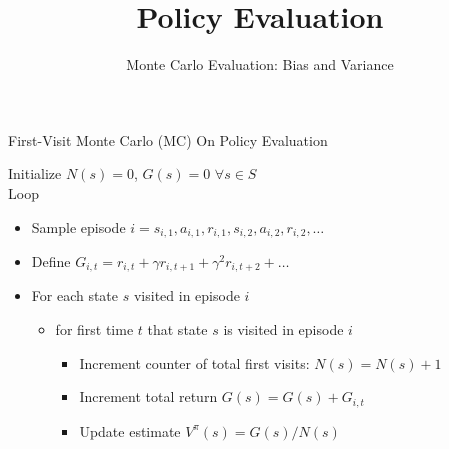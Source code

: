 


\title[Reinforcement Learning: Policy Evaluation]{Policy Evaluation}
\subtitle{Monte Carlo Evaluation: Bias and Variance}




	
	\maketitle

\begin{frame}[c]{First-Visit Monte Carlo (MC) On Policy Evaluation}

Initialize $N(s) = 0$, $G(s) = 0$ $\forall s \in S$\\
Loop 
\begin{itemize}
	\item Sample episode $i = s_{i,1}, a_{i,1}, r_{i,1}, s_{i,2}, a_{i,2}, r_{i,2}, \ldots$
	\item Define $G_{i,t} = r_{i,t} + \gamma r_{i,t+1} + \gamma^2 r_{i,t+2} + \ldots$
	\item For each state $s$ visited in episode $i$
	\begin{itemize}
		\item for first time $t$ that state $s$ is visited in episode $i$
		\begin{itemize}
			\item Increment counter of total first visits: $N(s) = N(s) + 1$
			\item Increment total return $G(s) = G(s) + G_{i,t}$
			\item Update estimate $V^\pi (s) = G(s) /N(s)$
		\end{itemize}
	\end{itemize}
\end{itemize}
	
\end{frame}

